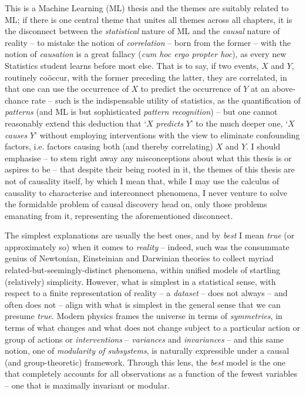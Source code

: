 %
This is a Machine Learning (ML) thesis and the themes are suitably related to ML; if there
is one central theme that unites all themes across all chapters, it is the disconnect
between the \emph{statistical} nature of ML and the \emph{causal} nature of reality -- to mistake
the notion of \emph{correlation} -- born from the former -- with the notion of \emph{causation} is
a great fallacy (\emph{cum hoc ergo propter hoc}), as every new Statistics student learns before
most else.
%
That is to say, if two events, \(X\) and \(Y\), routinely co{\"o}ccur, with the former preceding
the latter, they are correlated, in that one can use the occurrence of \(X\) to predict the
occurrence of \(Y\) at an above-chance rate -- such is the indispensable utility of statistics, as
the quantification of \emph{patterns} (and ML is but sophisticated \emph{pattern recognition}) --
but one cannot reasonably extend this deduction that `\(X\) \emph{predicts} \(Y\)' to the much
deeper one, `\(X\) \emph{causes} \(Y\)' without employing interventions with the view to eliminate
confounding factors, i.e. factors causing both (and thereby correlating) \(X\) and \(Y\).
%
I should emphasise -- to stem right away any misconceptions about what this thesis is or aspires to
be -- that despite their being rooted in it, the themes of this thesis are not of causality itself,
by which I mean that, while I may use the calculus of causality to characterise and interconnect
phenomena, I never venture to solve the formidable problem of causal discovery head on, only those
problems emanating from it, representing the aforementioned disconnect.
%

The simplest explanations are usually the best ones, and by \emph{best} I mean \emph{true} (or
approximately so) when it comes to \emph{reality} -- indeed, such was the consummate genius of
Newtonian, Einsteinian and Darwinian theories to collect myriad related-but-seemingly-distinct
phenomena, within unified models of startling (relatively) simplicity.
%
However, what is simplest in a statistical sense, with respect to a finite representation of
reality -- a \emph{dataset} -- does not always -- and often does not -- align with what is simplest
in the general sense that we can presume \emph{true}.
%
Modern physics frames the universe in terms of \emph{symmetries}, in terms of what changes and what
does not change subject to a particular action or group of actions or \emph{interventions} --
\emph{variances} and \emph{invariances} -- and this same notion, one of \emph{modularity of
subsystems}, is naturally expressible under a causal (and group-theoretic) framework.
%
Through this lens, the \emph{best} model is the one that completely accounts for all observations
as a function of the fewest variables -- one that is maximally invariant or modular.

